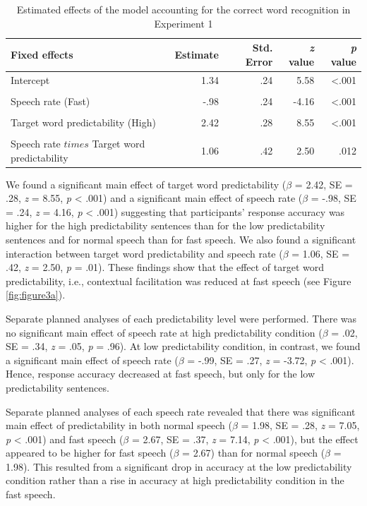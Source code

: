\documentclass[a4paper, nobind]{templates/ociamthesis}
\begin{document}
\begin{table}[ht]
\begin{center}
\caption{Estimated effects of the model accounting for the correct word recognition in Experiment 1}
\label{results3a} 
\vskip 0.12in
\begin{tabular}[]{@{}lrrrr@{}}
\toprule
Fixed effects & Estimate & Std. Error & \emph{z} value & \emph{p}
value \\
\midrule
Intercept & 1.34 & .24 & 5.58 & \textless.001 \\
\\
Speech rate (Fast) & -.98 & .24 & -4.16 & \textless.001 \\
\\
Target word predictability (High) & 2.42 & .28 & 8.55 & \textless.001 \\
\\
Speech rate $times$ Target word predictability & 1.06 & .42 & 2.50 & .012 \\
\bottomrule
\end{tabular} 
\end{center} 
\end{table}

We found a significant main effect of target word predictability (\(\beta\) = 2.42, SE = .28, \emph{z} = 8.55, \emph{p} \textless{} .001) and a significant main effect of speech rate (\(\beta\) = -.98, SE = .24, \emph{z} = 4.16, \emph{p} \textless{} .001)
suggesting that participants' response accuracy was higher for the high predictability sentences than for the low predictability sentences and for normal speech than for fast speech.
We also found a significant interaction between target word predictability and speech rate (\(\beta\) = 1.06, SE = .42, \emph{z} = 2.50, \emph{p} = .01).
These findings show that the effect of target word predictability, i.e., contextual facilitation was reduced at fast speech (see Figure \ref{fig:figure3a}).

Separate planned analyses of each predictability level were performed.
There was no significant main effect of speech rate at high predictability condition (\(\beta\) = .02, SE = .34, \emph{z} = .05, \emph{p} = .96).
At low predictability condition, in contrast, we found a significant main effect of speech rate (\(\beta\) = -.99, SE = .27, \emph{z} = -3.72, \emph{p} \textless{} .001).
Hence, response accuracy decreased at fast speech, but only for the low predictability sentences.

Separate planned analyses of each speech rate revealed that there was significant main effect of predictability in both normal speech (\(\beta\) = 1.98, SE = .28, \emph{z} = 7.05, \emph{p} \textless{} .001) and fast speech (\(\beta\) = 2.67, SE = .37, \emph{z} = 7.14, \emph{p} \textless{} .001),
but the effect appeared to be higher for fast speech (\(\beta\) = 2.67) than for normal speech (\(\beta\) = 1.98).
This resulted from a significant drop in accuracy at the low predictability condition rather than a rise in accuracy at high predictability condition in the fast speech.
\end{document}
